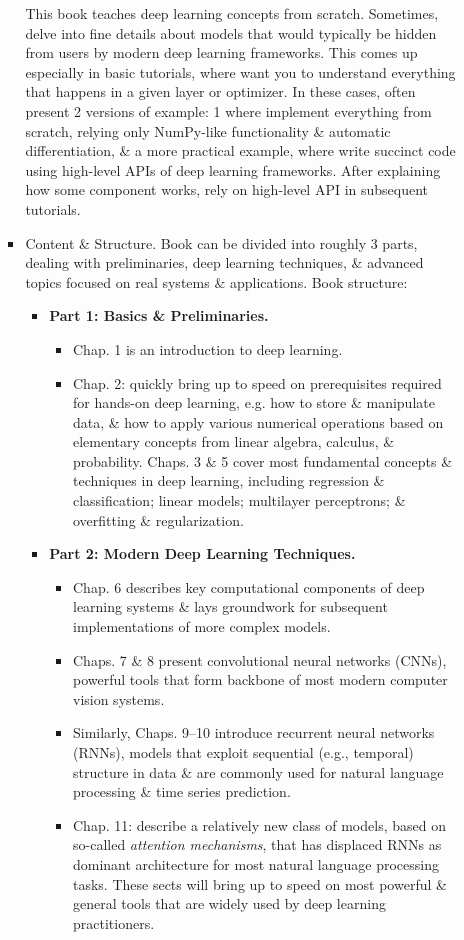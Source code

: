 \documentclass{article}
\begin{document}
\begin{enumerate}
\begin{itemize}
\begin{itemize}
			This book teaches deep learning concepts from scratch. Sometimes, delve into fine details about models that would typically be hidden from users by modern deep learning frameworks. This comes up especially in basic tutorials, where want you to understand everything that happens in a given layer or optimizer. In these cases, often present 2 versions of example: 1 where implement everything from scratch, relying only NumPy-like functionality \& automatic differentiation, \& a more practical example, where write succinct code using high-level APIs of deep learning frameworks. After explaining how some component works, rely on high-level API in subsequent tutorials.
			\item {\sf Content \& Structure.} Book can be divided into roughly 3 parts, dealing with preliminaries, deep learning techniques, \& advanced topics focused on real systems \& applications. Book structure:
			\begin{itemize}
				\item {\bf Part 1: Basics \& Preliminaries.}
				\begin{itemize}
					\item Chap. 1 is an introduction to deep learning.
					\item Chap. 2: quickly bring up to speed on prerequisites required for hands-on deep learning, e.g. how to store \& manipulate data, \& how to apply various numerical operations based on elementary concepts from linear algebra, calculus, \& probability. Chaps. 3 \& 5 cover most fundamental concepts \&  techniques in deep learning, including regression \& classification; linear models; multilayer perceptrons; \& overfitting \& regularization.
				\end{itemize}
				\item {\bf Part 2: Modern Deep Learning Techniques.}
				\begin{itemize}
					\item Chap. 6 describes key computational components of deep learning systems \& lays groundwork for subsequent implementations of more complex models.
					\item Chaps. 7 \& 8 present convolutional neural networks (CNNs), powerful tools that form backbone of most modern computer vision systems.
					\item Similarly, Chaps. 9--10 introduce recurrent neural networks (RNNs), models that exploit sequential (e.g., temporal) structure in data \& are commonly used for natural language processing \& time series prediction.
					\item Chap. 11: describe a relatively new class of models, based on so-called {\it attention mechanisms}, that has displaced RNNs as dominant architecture for most natural language processing tasks. These sects will bring up to speed on most powerful \& general tools that are widely used by deep learning practitioners.

\end{itemize}
\end{itemize}
\end{itemize}
\end{itemize}
\end{enumerate}
\end{document}
